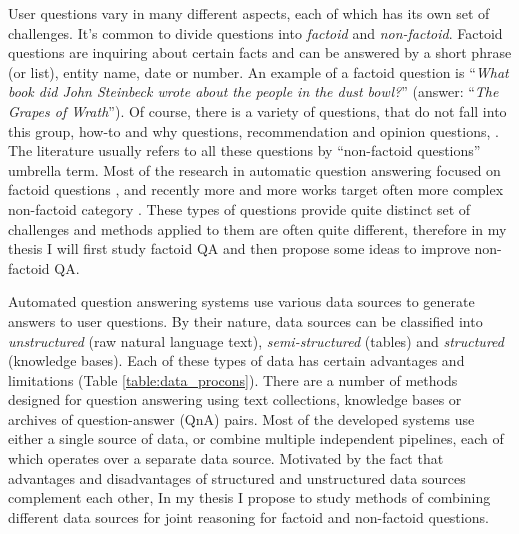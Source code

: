 User questions vary in many different aspects, each of which has its own set of challenges.
It's common to divide questions into \textit{factoid} and \textit{non-factoid}.
Factoid questions are inquiring about certain facts and can be answered by a short phrase (or list), \ie entity name, date or number.
An example of a factoid question is ``\textit{What book did John Steinbeck wrote about the people in the dust bowl?}'' (answer: ``\textit{The Grapes of Wrath}'').
Of course, there is a variety of questions, that do not fall into this group, \eg how-to and why questions, recommendation and opinion questions, \etc.
The literature usually refers to all these questions by ``non-factoid questions'' umbrella term.
Most of the research in automatic question answering focused on factoid questions \cite{voorhees2001trec}, and recently more and more works target often more complex non-factoid category \cite{overviewliveqa15}.
These types of questions provide quite distinct set of challenges and methods applied to them are often quite different, therefore in my thesis I will first study factoid QA and then propose some ideas to improve non-factoid QA.

Automated question answering systems use various data sources to generate answers to user questions.
By their nature, data sources can be classified into \textit{unstructured} (\eg raw natural language text), \textit{semi-structured} (\eg tables) and \textit{structured} (\eg knowledge bases).
Each of these types of data has certain advantages and limitations (Table \ref{table:data_procons}).
There are a number of methods designed for question answering using text collections, knowledge bases or archives of question-answer (QnA) pairs.
Most of the developed systems use either a single source of data, or combine multiple independent pipelines, each of which operates over a separate data source.
Motivated by the fact that advantages and disadvantages of structured and unstructured data sources complement each other, In my thesis I propose to study methods of combining different data sources for joint reasoning for factoid and non-factoid questions.

